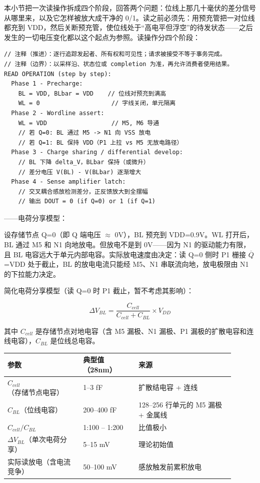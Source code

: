 
本小节把一次读操作拆成四个阶段，回答两个问题：位线上那几十毫伏的差分信号从哪里来，以及它怎样被放大成干净的 0/1。读之前必须先：用预充管把一对位线都充到 VDD，然后关断预充管，使位线处于“高电平但浮空”的待发状态——之后发生的一切电压变化都以这个起点为参照。读操作分四个阶段：

\begin{lstlisting}
// 注释（推进）：逐行追踪发起者、所有权和可见性；请求被接受不等于事务完成。
// 注释（边界）：以采样沿、状态位或 completion 为准，再允许消费者使用结果。
READ OPERATION (step by step):
  Phase 1 - Precharge:
    BL = VDD, BLbar = VDD    // 位线对预充到满高
    WL = 0                    // 字线关闭，单元隔离
  Phase 2 - Wordline assert:
    WL = VDD                  // M5, M6 导通
    // 若 Q=0: BL 通过 M5 -> N1 向 VSS 放电
    // 若 Q=1: BL 保持 VDD（P1 上拉 vs M5 无放电路径）
  Phase 3 - Charge sharing / differential develop:
    // BL 下降 delta_V，BLbar 保持（或微升）
    // 差分电压 V(BL) - V(BLbar) 逐渐增大
  Phase 4 - Sense amplifier latch:
    // 交叉耦合感放检测差分，正反馈放大到全摆幅
    // 输出 DOUT = 0 (if Q=0) or 1 (if Q=1)
\end{lstlisting}

——电荷分享模型：

设存储节点 Q=0（即 Q 端电压 $\approx$ 0V），BL 预充到 VDD=0.9V。WL 打开后，BL 通过 M5 和 N1 向地放电。但放电不是到 0V——因为 N1 的驱动能力有限，且 BL 电容远大于单元内部电容。实际放电速度由决定：读 Q=0 侧时 P1 栅接 $\overline{Q}$=VDD 处于截止，BL 的放电电流只能经 M5、N1 串联流向地，放电极限由 N1 的下拉能力决定。

简化电荷分享模型（读 Q=0 时 P1 截止，暂不考虑其影响）：

$$\Delta V_{BL} = \frac{C_{cell}}{C_{cell} + C_{BL}} \times V_{DD}$$

其中 $C_{cell}$ 是存储节点对地电容（含 M5 漏极、N1 漏极、P1 漏极的扩散电容和连线电容），$C_{BL}$ 是位线总电容。

\begin{longtable}{L{0.30\linewidth}L{0.22\linewidth}L{0.38\linewidth}}
\toprule
参数 & 典型值（28nm） & 来源 \\
\midrule
$C_{cell}$（存储节点电容） & 1--3 fF & 扩散结电容 + 连线 \\\tablerowrule
$C_{BL}$（位线电容） & 200--400 fF & 128--256 行单元的 M5 漏极 + 金属线 \\\tablerowrule
$C_{cell}/C_{BL}$ & 1:100 -- 1:200 & 比值极小 \\\tablerowrule
$\Delta V_{BL}$（单次电荷分享） & 5--15 mV & 理论初始值 \\\tablerowrule
实际读放电（含电流竞争） & 50--100 mV & 感放触发前累积放电 \\
\bottomrule
\end{longtable}

